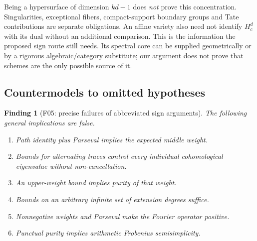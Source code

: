 \documentclass[11pt,a4paper]{article}
\newcommand{\fid}[1]{\textsf{#1}}\newcommand{\gate}[1]{\textsf{#1}}
\theoremstyle{named}\newtheorem{finding}{Finding}[section]
\theoremstyle{definition}\newtheorem{definition}[finding]{Definition}
\theoremstyle{remark}\newtheorem{remark}[finding]{Remark}
\begin{document}
Being a hypersurface of dimension $kd-1$ does \emph{not} prove this concentration. Singularities, exceptional fibers, compact-support boundary groups and Tate contributions are separate obligations. An affine variety also need not identify $H_c^d$ with its dual without an additional comparison. This is the information the proposed sign route still needs. Its spectral core can be supplied geometrically or by a rigorous algebraic/category substitute; our argument does not prove that schemes are the only possible source of it.

\subsection{Countermodels to omitted hypotheses}
\begin{finding}[\fid{F05}: precise failures of abbreviated sign arguments]\label{f:countermodels}
The following general implications are false.
\begin{enumerate}[label=(\alph*)]
\item Path identity plus Parseval implies the expected middle weight.
\item Bounds for alternating traces control every individual cohomological eigenvalue without non-cancellation.
\item An upper-weight bound implies purity of that weight.
\item Bounds on an arbitrary infinite set of extension degrees suffice.
\item Nonnegative weights and Parseval make the Fourier operator positive.
\item Punctual purity implies arithmetic Frobenius semisimplicity.
\end{enumerate}
\end{finding}
\end{document}
